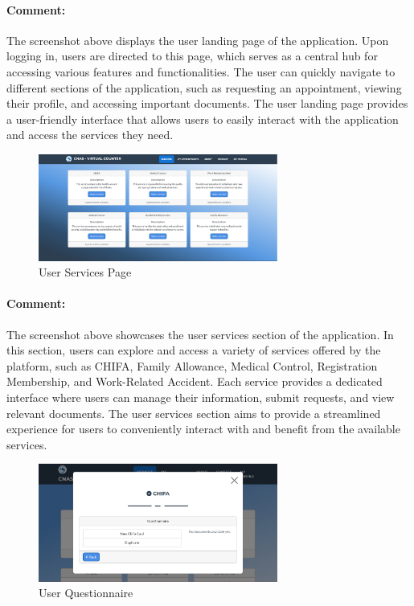\begin{itemize}
\paragraph{Comment:} The screenshot above displays the user landing page of the application. Upon logging in, users are directed to this page, which serves as a central hub for accessing various features and functionalities. The user can quickly navigate to different sections of the application, such as requesting an appointment, viewing their profile, and accessing important documents. The user landing page provides a user-friendly interface that allows users to easily interact with the application and access the services they need.

\begin{figure}[htbp]
    \centering
    \includegraphics[width=0.7\textwidth]{SCREENSHOTS/user/services.png}
    \caption{User Services Page}
    \label{fig:user-services}
\end{figure}
\paragraph{Comment:} The screenshot above showcases the user services section of the application. In this section, users can explore and access a variety of services offered by the platform, such as CHIFA, Family Allowance, Medical Control, Registration Membership, and Work-Related Accident. Each service provides a dedicated interface where users can manage their information, submit requests, and view relevant documents. The user services section aims to provide a streamlined experience for users to conveniently interact with and benefit from the available services.
\newpage


\begin{figure}[htbp]
    \centering
    \includegraphics[width=0.7\textwidth]{SCREENSHOTS/user/questionnaire.png}
    \caption{User Questionnaire}
    \label{fig:user-questionnaire}
\end{figure}

\end{itemize}
